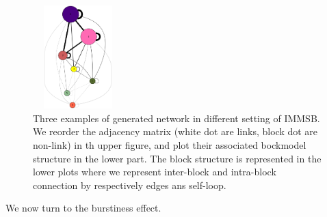 \begin{figure}[h]
	\endminipage
	\includegraphics[width=3.5cm, height=4cm]{img/M_g_regular/graph_dot}
	\endminipage
	\caption{Three examples of generated network in different setting of IMMSB. We reorder the adjacency matrix (white dot are links, block dot are non-link) in th upper figure, and plot their associated bockmodel structure in the lower part. The block structure is represented in the lower plots where we represent inter-block and intra-block connection by respectively edges ans self-loop.  }
	\label{fig:gen_blocks}
\end{figure}


 We now turn to the burstiness effect.
